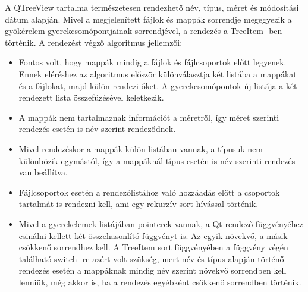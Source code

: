 
\vspace{3mm}

A {\ttfamily QTreeView} tartalma természetesen rendezhető név, típus, méret 
és módosítási dátum alapján. 
Mivel a megjelenített fájlok és mappák sorrendje megegyezik 
a gyökérelem gyerekcsomópontjainak sorrendjével, 
a rendezés a {\ttfamily TreeItem} -ben történik. 
\newline
A rendezést végző algoritmus jellemzői:
\begin{itemize}
\item
Fontos volt, hogy mappák mindig a fájlok és fájlcsoportok előtt legyenek. 
Ennek eléréshez az algoritmus először különválasztja két listába 
a mappákat és a fájlokat, majd külön rendezi őket. 
A gyerekcsomópontok új listája a két rendezett lista összefűzésével keletkezik. 
\item
A mappák nem tartalmaznak információt a méretről, 
így méret szerinti rendezés esetén is név szerint rendeződnek. 
\item
Mivel rendezéskor a mappák külön listában vannak, 
a típusuk nem különbözik egymástól, 
így a mappáknál típus esetén is név szerinti rendezés van beállítva.
\item
Fájlcsoportok esetén a rendezőlistához való hozzáadás előtt 
a csoportok tartalmát is rendezni kell, 
ami egy rekurzív {\ttfamily sort} hívással történik.
\item
Mivel a gyerekelemek listájában pointerek vannak, 
a Qt rendező függvényéhez csinálni kellett két összehasonlító függvényt is. 
Az egyik növekvő, a másik csökkenő sorrendhez kell. 
A {\ttfamily TreeItem} {\ttfamily sort}
függvényében a függvény végén 
található switch -re azért volt szükség, 
mert név és típus alapján történő rendezés esetén 
a mappáknak mindig név szerint növekvő sorrendben kell lenniük,
még akkor is, ha a rendezés egyébként csökkenő sorrendben történik.
\end{itemize}
